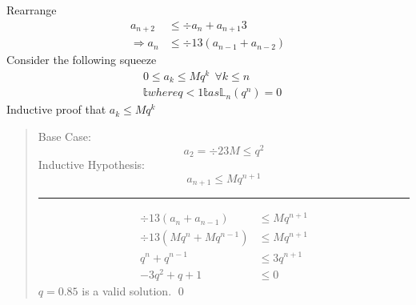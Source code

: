 \section{}
    \subsection{}
    Rearrange
    \begin{align*}
        a_{n+2} &≤ ÷ {a_{n}+a_{n+1}}{3} \\ 
        ⇒a_{n} &≤ ÷ {1}{3} (a_{n-1}+a_{n-2})
    \end{align*}
    Consider the following squeeze
    \begin{align*}
        & 0 \leq a_{k} \leq   Mq^{k}\ \ \forall k \leq   n \\
        & 𝕥{where } q<1 𝕥{ as } 𝕃_{n}(q^{n})=0
    \end{align*}
    Inductive proof that $a_{k} ≤ Mq^{k}$
    \begin{quote}
        Base Case:
            $$ a_{2} = ÷ {2}{3M}  \leq  q^{2} $$
        Inductive Hypothesis:
            $$ a_{n+1}\le Mq^{n+1} $$
        \hrule
        \begin{align*}
            ÷{1}{3}\left(a_{n}+a_{n-1}\right) &\le Mq^{n+1} \\
            ÷{1}{3}\left(Mq^{n}+Mq^{n-1}\right) &\le Mq^{n+1} \\
            q^{n}+q^{n-1} &\le 3q^{n+1} \\
            -3q^{2}+q+1 &\le 0
        \end{align*}
        $q=0.85$ is a valid solution. \qed
    \end{quote}